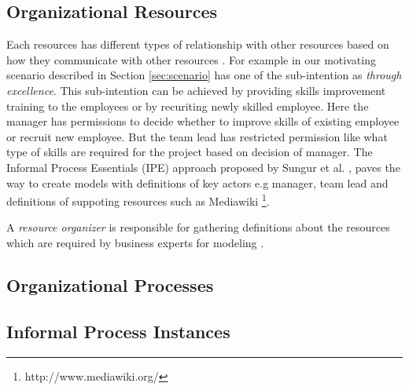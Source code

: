 \subsection{Organizational Resources} 
\label{sec:resources}

Each resources has different types of relationship with other resources based on how they communicate with other resources \cite{Sungur2015}. For example in our motivating scenario described in Section \ref{sec:scenario} has one of the sub-intention as \textit{through excellence}. This sub-intention can be achieved by providing skills improvement training to the employees or by recuriting newly skilled employee. Here the manager has permissions to decide whether to improve skills of existing employee or recruit new employee. But the team lead has restricted permission like what type of skills are required for the project based on decision of manager. The Informal Process Essentials (IPE) approach proposed by Sungur et al. \cite{Sungur2015}, paves the way to create models with definitions of key actors e.g manager, team lead and definitions of suppoting resources such as Mediawiki \footnote{http://www.mediawiki.org/}.

A \textit{resource organizer} is responsible for gathering definitions about the resources which are required by business experts for modeling \cite{Sungur2014a}.  



\subsection{Organizational Processes} 
\label{sec:processes}

\subsection{Informal Process Instances} 
\label{sec:ipinstances}
